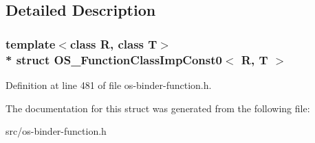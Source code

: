 \subsection{Detailed Description}
\subsubsection*{template$<$class R, class T$>$\\*
struct O\+S\+\_\+\+Function\+Class\+Imp\+Const0$<$ R, T $>$}



Definition at line 481 of file os-\/binder-\/function.\+h.



The documentation for this struct was generated from the following file\+:\begin{DoxyCompactItemize}
\item 
src/os-\/binder-\/function.\+h\end{DoxyCompactItemize}
